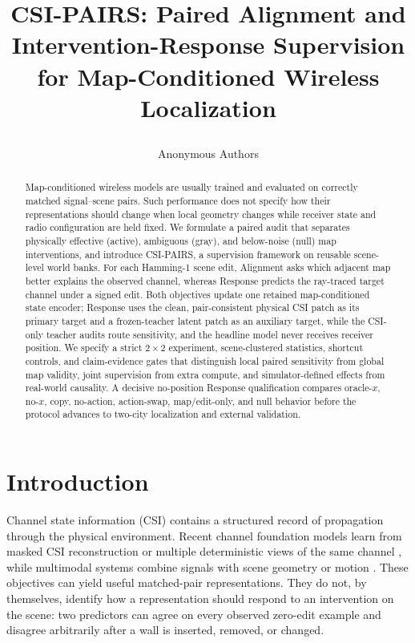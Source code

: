 \documentclass{article}
\title{\raggedright CSI-PAIRS: Paired Alignment and Intervention-Response
Supervision for Map-Conditioned Wireless Localization}
\author{Anonymous Authors}
\newcommand{\method}{CSI-PAIRS}
\begin{document}
\maketitle

\begin{abstract}
Map-conditioned wireless models are usually trained and evaluated on correctly
matched signal--scene pairs.  Such performance does not specify how their
representations should change when local geometry changes while receiver state
and radio configuration are held fixed.  We formulate a paired audit that
separates physically effective (active), ambiguous (gray), and below-noise
(null) map interventions, and introduce \method{}, a supervision framework on
reusable scene-level world banks.  For each Hamming-1 scene edit, Alignment asks
which adjacent map better explains the observed channel, whereas Response
predicts the ray-traced target channel under a signed edit.  Both objectives
update one retained map-conditioned state encoder; Response uses the clean,
pair-consistent physical CSI patch as its primary target and a frozen-teacher
latent patch as an auxiliary target, while the CSI-only teacher audits route sensitivity,
and the headline model never receives receiver position.  We specify a strict $2\times2$ experiment, scene-clustered
statistics, shortcut controls, and claim-evidence gates that distinguish local
paired sensitivity from global map validity, joint supervision from extra
compute, and simulator-defined effects from real-world causality.  A decisive
no-position Response qualification compares oracle-$x$, no-$x$, copy,
no-action, action-swap, map/edit-only, and null behavior before the protocol
advances to two-city localization and external validation.
\end{abstract}

\section{Introduction}

Channel state information (CSI) contains a structured record of propagation
through the physical environment.  Recent channel foundation models learn from
masked CSI reconstruction or multiple deterministic views of the same channel
\citep{jiang2026csimae,jiang2025csiclip,jiang2026csiclippp}, while multimodal
systems combine signals with scene geometry or motion
\citep{chen2026wwm,chu2026sigmap}.  These objectives can yield useful matched-pair
representations.  They do not, by themselves, identify how a representation
should respond to an intervention on the scene: two predictors can agree on
every observed zero-edit example and disagree arbitrarily after a wall is
inserted, removed, or changed.
\end{document}
